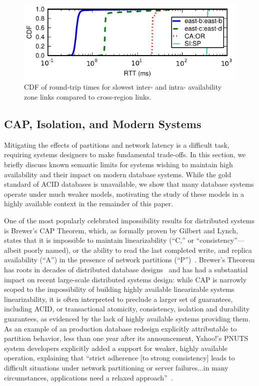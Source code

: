 \begin{figure}
\includegraphics[width=\columnwidth]{graphs/ping-plot.pdf}
\caption{CDF of round-trip times for slowest inter- and intra-
  availability zone links compared to cross-region links.}
\label{fig:rtt}
\end{figure}


\subsection{CAP, Isolation, and Modern Systems}
\label{sec:modernacid}

Mitigating the effects of partitions and network latency is a
difficult task, requiring systems designers to make fundamental
trade-offs. In this section, we briefly discuss known semantic limits
for systems wishing to maintain high availability and their impact on
modern database systems. While the gold standard of ACID databases is
unavailable, we show that many database systems operate under much
weaker models, motivating the study of these models in a highly
available context in the remainder of this paper.

One of the most popularly celebrated impossibility results for
distributed systems is Brewer's CAP Theorem, which, as formally proven
by Gilbert and Lynch, states that it is impossible to maintain
linearizability (``C,'' or ``consistency''---albeit poorly named), or
the ability to read the last completed write, and replica availability
(``A'') in the presence of network partitions
(``P'')~\cite{gilbert-cap}. Brewer's Theorem has roots in decades of
distributed database designs~\cite{davidson-survey} and has had a
substantial impact on recent large-scale distributed systems design:
while CAP is narrowly scoped to the impossibility of building highly
available linearizable systems linearizability, it is often
interpreted to preclude a larger set of guarantees, including ACID, or
transactional atomicity, consistency, isolation and durability
guarantees, as evidenced by the lack of highly available systems
providing them.  As an example of an production database redesign
explicitly attributable to partition behavior, less than one year
after its announcement, Yahoo!'s PNUTS system developers explicitly
added a support for weaker, highly available operation, explaining
that ``strict adherence [to strong consistency] leads to difficult
situations under network partitioning or server failures...in many
circumstances, applications need a relaxed
approach''~\cite{pnuts-update}.

